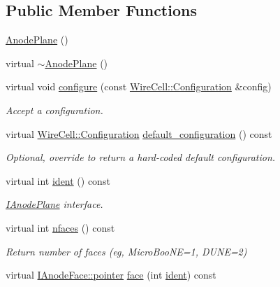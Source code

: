 \subsection*{Public Member Functions}
\begin{DoxyCompactItemize}
\item 
\hyperlink{class_wire_cell_1_1_gen_1_1_anode_plane_a07e74cb8207634c5064d5a186f61e9b6}{Anode\+Plane} ()
\item 
virtual \hyperlink{class_wire_cell_1_1_gen_1_1_anode_plane_a41df48506ad084531fa7ac376f454894}{$\sim$\+Anode\+Plane} ()
\item 
virtual void \hyperlink{class_wire_cell_1_1_gen_1_1_anode_plane_a2d1c7a1dded73fe3b51cbcfb8d9e0e04}{configure} (const \hyperlink{namespace_wire_cell_a9f705541fc1d46c608b3d32c182333ee}{Wire\+Cell\+::\+Configuration} \&config)
\begin{DoxyCompactList}\small\item\em Accept a configuration. \end{DoxyCompactList}\item 
virtual \hyperlink{namespace_wire_cell_a9f705541fc1d46c608b3d32c182333ee}{Wire\+Cell\+::\+Configuration} \hyperlink{class_wire_cell_1_1_gen_1_1_anode_plane_acc2e184daee40976feb1b2a1b6171905}{default\+\_\+configuration} () const
\begin{DoxyCompactList}\small\item\em Optional, override to return a hard-\/coded default configuration. \end{DoxyCompactList}\item 
virtual int \hyperlink{class_wire_cell_1_1_gen_1_1_anode_plane_afe12d9d6f826b42e66d9ab9da7799dae}{ident} () const
\begin{DoxyCompactList}\small\item\em \hyperlink{class_wire_cell_1_1_i_anode_plane}{I\+Anode\+Plane} interface. \end{DoxyCompactList}\item 
virtual int \hyperlink{class_wire_cell_1_1_gen_1_1_anode_plane_a67547b54d01b3112b8a194660d1d2f2a}{nfaces} () const
\begin{DoxyCompactList}\small\item\em Return number of faces (eg, Micro\+Boo\+NE=1, D\+U\+NE=2) \end{DoxyCompactList}\item 
virtual \hyperlink{class_wire_cell_1_1_interface_a09c548fb8266cfa39afb2e74a4615c37}{I\+Anode\+Face\+::pointer} \hyperlink{class_wire_cell_1_1_gen_1_1_anode_plane_a429403f80c922cd168213c049ecadeea}{face} (int \hyperlink{class_wire_cell_1_1_gen_1_1_anode_plane_afe12d9d6f826b42e66d9ab9da7799dae}{ident}) const

\end{DoxyCompactItemize}
